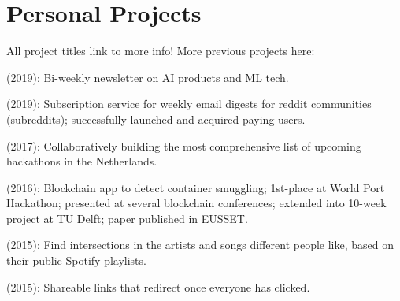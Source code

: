 \documentclass[]{deedy-resume-openfont}
\begin{document}
\begin{minipage}[t]{0.66\textwidth}


\section{Personal Projects}

All project titles link to more info! More previous projects here: \href{http://leonoverweel.com/}{}

\begin{tightemize}
    \item \href{https://www.getrevue.co/profile/dynamically-typed}{} (2019): Bi-weekly newsletter on AI products and ML tech.
    \item \href{https://weekly.cool}{} (2019): Subscription service for weekly email digests for reddit communities (subreddits); successfully launched and acquired paying users.
    \item \href{http://hackathonlist.nl/}{} (2017): Collaboratively building the most comprehensive list of upcoming hackathons in the Netherlands.
    \item \href{http://leonoverweel.com/world-port-hackathon-2016}{} (2016): Blockchain app to detect container smuggling; 1st-place at World Port Hackathon; presented at several blockchain conferences; extended into 10-week project at TU Delft; paper published in EUSSET.
    \item \href{http://leonoverweel.com/intersect.ninja}{} (2015): Find intersections in the artists and songs different people like, based on their public Spotify playlists.
    \item \href{http://leonoverweel.com/link-syncer}{} (2015): Shareable links that redirect once everyone has clicked. 
\end{tightemize}



\end{minipage}
\end{document}
